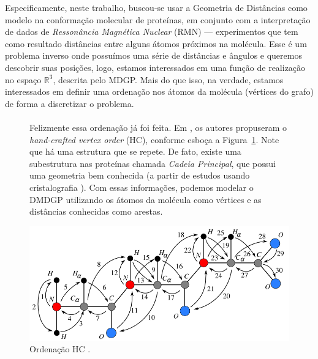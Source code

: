 \documentclass[a4,11pt]{pssbmac}
\begin{document}
	Especificamente, neste trabalho, buscou-se usar a Geometria de Distâncias como modelo na conformação molecular de proteínas, em conjunto com a interpretação de dados de \textit{Ressonância Magnética Nuclear} (RMN) --- experimentos que tem como resultado distâncias entre alguns átomos próximos na molécula. Esse é um problema inverso onde possuímos uma série de distâncias e ângulos e queremos descobrir suas posições, logo, estamos interessados em uma função de realização no espaço $\mathbb{R}^3$, descrita pelo MDGP. Mais do que isso, na verdade, estamos interessados em definir uma ordenação nos átomos da molécula (vértices do grafo) de forma a discretizar o problema.
	
	\vspace{-0.25cm}
	\begin{figure}[h!]
		\centering
		\begin{minipage}{0.43\linewidth}   
			\paragraph{} Felizmente essa ordenação já foi feita. Em \cite{carlile:MinimalOrder}, os autores propuseram o \textit{hand-crafted vertex order} (HC), conforme esboça a Figura~\ref{fig:hcVO}. Note que há uma estrutura que se repete. De fato, existe uma subestrutura nas proteínas chamada \textit{Cadeia Principal}, que possui uma geometria bem conhecida (a partir de estudos usando cristalografia \cite{fidalgotese}). Com essas informações, podemos modelar o DMDGP utilizando os átomos da molécula como vértices e as distâncias conhecidas como arestas.
		\end{minipage}
		\begin{minipage}{0.563\linewidth}
			\includegraphics[scale=0.585]{hcVO.png}
			\caption{Ordenação HC \cite{carlile:MinimalOrder}.}
			\label{fig:hcVO}
		\end{minipage}
	\end{figure}
	\vspace{-0.25cm}
	
\end{document}
